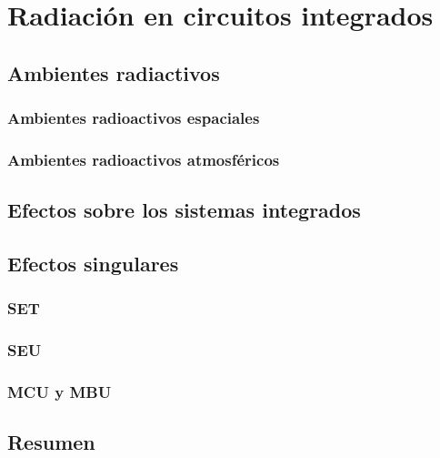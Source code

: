\chapter{Radiación en circuitos integrados}
    

    \section{Ambientes radiactivos}
    
        \subsection{Ambientes radioactivos espaciales}
        
        \subsection{Ambientes radioactivos atmosféricos}
        

\section{Efectos sobre los sistemas integrados}


\section{Efectos singulares}


    \subsection{SET}
    
    \subsection{SEU}
    
    \subsection{MCU y MBU}
    

\section{Resumen}

